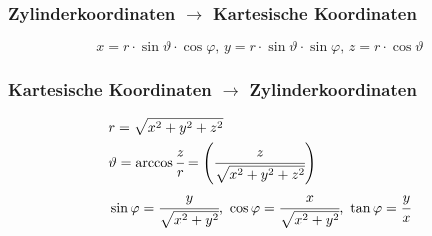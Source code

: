 \documentclass[a4paper,10pt]{scrartcl}
\begin{document}
            \subsubsection*{Zylinderkoordinaten \(\rightarrow\) Kartesische Koordinaten}
                \begin{equation*}
                    x = r \cdot \sin \vartheta \cdot \cos \varphi \text{, } y = r \cdot \sin \vartheta \cdot \sin \varphi \text{, } z = r \cdot \cos \vartheta
                \end{equation*}
            \subsubsection*{Kartesische Koordinaten \(\rightarrow\) Zylinderkoordinaten}
            \begin{equation}
                \begin{aligned}
                    & r = \sqrt{x^2 + y^2 + z^2} \\
                    & \vartheta = \arccos \cfrac{z}{r} = \Bigg( \cfrac{z}{\sqrt{x^2 + y^2 + z^2}} \Bigg) \\
                    & \sin \varphi = \cfrac{y}{\sqrt{x^2 + y^2}} \text{, } \cos \varphi = \cfrac{x}{\sqrt{x^2 + y^2}} \text{, } \tan \varphi = \cfrac{y}{x}  
                \end{aligned}
            \end{equation}
            
\end{document}

